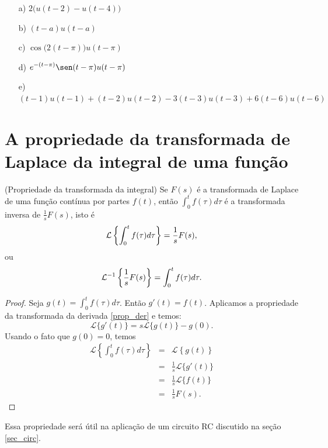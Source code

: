 \begin{resp}
\begin{itemize}
\item[a)] $\displaystyle 2 \big( u(t-2) - u(t-4) \big)$
  \item[b)] $\displaystyle (t-a)u(t-a)$
  \item[c)] $\displaystyle \cos\big(2(t-\pi)\big)u(t-\pi)$
  \item[d)] $\displaystyle e^{-(t-\pi)} \sen(t-\pi)u(t-\pi)$
  \item[e)] $\displaystyle (t-1)u(t-1) + (t-2)u(t-2) -3(t-3)u(t-3) + 6(t-6)u(t-6)$
\end{itemize}
\end{resp}
  
\section{A propriedade da transformada de Laplace da integral de uma função}
\begin{teo}{\label{prop_trans_int}}(Propriedade da transformada da integral) Se $F(s)$ é a transformada de Laplace de uma função contínua por partes $f(t)$, então $\int_0^tf(\tau)d\tau$ é a transformada inversa de $\frac{1}{s}F(s)$, isto é
\begin{equation}{\label{eq_trans_int}}
\mathcal{L}\left\{\int_0^tf(\tau)d\tau\right\} =\frac{1}{s}F(s),
\end{equation}
ou
\begin{equation}{\label{eq_trans_int_inv}}
\mathcal{L}^{-1} \left\{\frac{1}{s}F(s)\right\} =\int_0^tf(\tau)d\tau.
\end{equation} 
\end{teo}
\begin{proof}Seja $g(t)=\int_0^tf(\tau)d\tau$. Então $g'(t)=f(t)$. Aplicamos a propriedade da transformada da derivada \ref{prop_der} e temos:
\begin{equation}
\mathcal{L}\{g'(t)\}=s\mathcal{L}\{g(t)\}-g(0).
\end{equation}
Usando o fato que $g(0)=0$, temos
\begin{eqnarray*}
\mathcal{L}\left\{\int_0^tf(\tau)d\tau\right\}&=&\mathcal{L}\left\{g(t)\right\}\\
&=&\frac{1}{s}\mathcal{L}\{g'(t)\}\\
&=&\frac{1}{s}\mathcal{L}\{f(t)\}\\
&=&\frac{1}{s}F(s).
\end{eqnarray*}
\end{proof}
Essa propriedade será útil na aplicação de um circuito RC discutido na seção \ref{sec_circ}.
